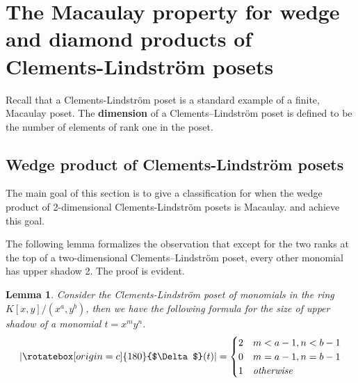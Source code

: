 \documentclass[11pt, reqno]{amsart}
\newcommand{\uSdw}{\rotatebox[origin=c]{180}{$\Delta$}}
\theoremstyle{plain} %
\newtheorem{lem}[thm]{Lemma}
\theoremstyle{definition}
\theoremstyle{remark}
\numberwithin{equation}{section}  %
\begin{document}
\section{The Macaulay property for wedge and diamond products of Clements-Lindstr\"om posets}\label{s: wd box}

Recall that a Clements-Lindstr\"om poset is a standard example of a finite, Macaulay poset. The {\bf dimension} of a Clements--Lindstr\"om poset  is defined to be the number of elements of rank one in the poset.

\subsection{Wedge product of Clements-Lindstr\"om posets}

The main goal of this section is to give a classification for when the wedge product of 2-dimensional Clements-Lindstr\"om posets is Macaulay.     and  achieve this goal.


    The following lemma formalizes the observation that except for the two ranks at the top of a two-dimensional Clements--Lindstr\"om poset, every other monomial has upper shadow 2. The proof is evident.

\begin{lem}\label{prop: size upper shadow of monomial in box}
Consider the Clements-Lindstr\"om poset of monomials in the ring $K[x,y]/(x^a,y^b)$, then we have the following formula for the size of upper shadow of a monomial $t = x^my^n$.
\[|\uSdw(t)| = \begin{cases} 
                    2 & m < a - 1, n < b - 1\\
                    0 & m = a-1 , n = b-1 \\
                    1 & \emph{otherwise}
                \end{cases}
                                    \]
\end{lem}
\end{document}
